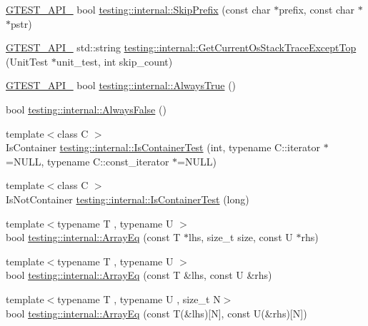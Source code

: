 \begin{DoxyCompactItemize}
\mbox{\hyperlink{gtest-port_8h_aa73be6f0ba4a7456180a94904ce17790}{G\+T\+E\+S\+T\+\_\+\+A\+P\+I\+\_\+}} bool \mbox{\hyperlink{namespacetesting_1_1internal_a244d9a3765727306b597b8992ab84036}{testing\+::internal\+::\+Skip\+Prefix}} (const char $\ast$prefix, const char $\ast$$\ast$pstr)
\item 
\mbox{\hyperlink{gtest-port_8h_aa73be6f0ba4a7456180a94904ce17790}{G\+T\+E\+S\+T\+\_\+\+A\+P\+I\+\_\+}} std\+::string \mbox{\hyperlink{namespacetesting_1_1internal_aeb475922b8cd1e6c60ac052bbc396e62}{testing\+::internal\+::\+Get\+Current\+Os\+Stack\+Trace\+Except\+Top}} (Unit\+Test $\ast$unit\+\_\+test, int skip\+\_\+count)
\item 
\mbox{\hyperlink{gtest-port_8h_aa73be6f0ba4a7456180a94904ce17790}{G\+T\+E\+S\+T\+\_\+\+A\+P\+I\+\_\+}} bool \mbox{\hyperlink{namespacetesting_1_1internal_a922c9da63cd4bf94fc473b9ecac76414}{testing\+::internal\+::\+Always\+True}} ()
\item 
bool \mbox{\hyperlink{namespacetesting_1_1internal_a4b24c851ab13569b1b15b3d259b60d2e}{testing\+::internal\+::\+Always\+False}} ()
\item 
{\footnotesize template$<$class C $>$ }\\Is\+Container \mbox{\hyperlink{namespacetesting_1_1internal_acb6ea1086293c1d6636e3c67941351fb}{testing\+::internal\+::\+Is\+Container\+Test}} (int, typename C\+::iterator $\ast$=N\+U\+LL, typename C\+::const\+\_\+iterator $\ast$=N\+U\+LL)
\item 
{\footnotesize template$<$class C $>$ }\\Is\+Not\+Container \mbox{\hyperlink{namespacetesting_1_1internal_af545a2ae928b8a9e7581978234464275}{testing\+::internal\+::\+Is\+Container\+Test}} (long)
\item 
{\footnotesize template$<$typename T , typename U $>$ }\\bool \mbox{\hyperlink{namespacetesting_1_1internal_af4bebf36baf0b0a5b26d051dde55fa47}{testing\+::internal\+::\+Array\+Eq}} (const T $\ast$lhs, size\+\_\+t size, const U $\ast$rhs)
\item 
{\footnotesize template$<$typename T , typename U $>$ }\\bool \mbox{\hyperlink{namespacetesting_1_1internal_a49b4d0ee49c0f8c93bab29ebd20630cc}{testing\+::internal\+::\+Array\+Eq}} (const T \&lhs, const U \&rhs)
\item 
{\footnotesize template$<$typename T , typename U , size\+\_\+t N$>$ }\\bool \mbox{\hyperlink{namespacetesting_1_1internal_a5cb6f81ee827130024261121c742b26c}{testing\+::internal\+::\+Array\+Eq}} (const T(\&lhs)\mbox{[}N\mbox{]}, const U(\&rhs)\mbox{[}N\mbox{]})
$$
\end{DoxyCompactItemize}
